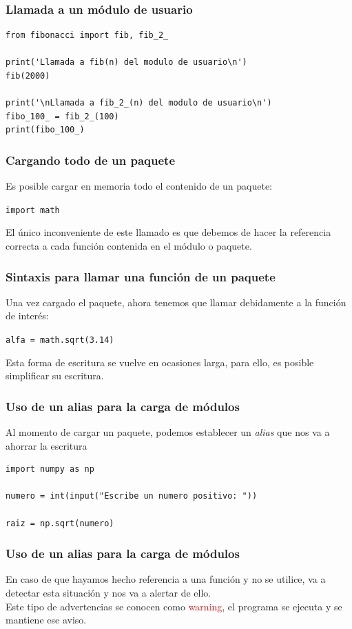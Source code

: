 \begin{frame}[fragile]
\frametitle{Llamada a un módulo de usuario}
\begin{lstlisting}[style=codigopython]
from fibonacci import fib, fib_2_

print('Llamada a fib(n) del modulo de usuario\n')
fib(2000)

print('\nLlamada a fib_2_(n) del modulo de usuario\n')
fibo_100_ = fib_2_(100)
print(fibo_100_)
\end{lstlisting}
\end{frame}
\begin{frame}[fragile]
\frametitle{Cargando todo de un paquete}
Es posible cargar en memoria todo el contenido de un paquete:
\begin{center}
\verb|import math|
\end{center}
\pause
El único inconveniente de este llamado es que debemos de hacer la referencia correcta a cada función contenida en el módulo o paquete.
\end{frame}
\begin{frame}[fragile]
\frametitle{Sintaxis para llamar una función de un paquete}
Una vez cargado el paquete, ahora tenemos que llamar debidamente a la función de interés:
\begin{center}
\verb|alfa = math.sqrt(3.14)|
\end{center}
\pause
Esta forma de escritura se vuelve en ocasiones larga, para ello, es posible simplificar su escritura.
\end{frame}
\begin{frame}[fragile]
\frametitle{Uso de un alias para la carga de módulos}
Al momento de cargar un paquete, podemos establecer un \emph{alias} que nos va a ahorrar la escritura
\begin{lstlisting}[style=codigopython]
import numpy as np

numero = int(input("Escribe un numero positivo: "))

raiz = np.sqrt(numero)
\end{lstlisting}
\end{frame}
\begin{frame}[fragile]
\frametitle{Uso de un alias para la carga de módulos}
En caso de que hayamos hecho referencia a una función y no se utilice,  va a detectar esta situación y nos va a alertar de ello.
\\
\bigskip
Este tipo de advertencias se conocen como \textcolor{red}{warning}, el programa se ejecuta y se mantiene ese aviso.
\end{frame}
